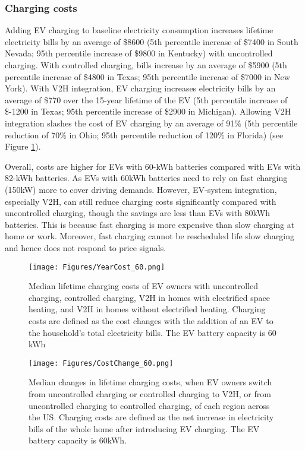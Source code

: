 \documentclass[11pt,preprint]{elsarticle}
\begin{document}
\subsubsection{Charging costs}

Adding EV charging to baseline electricity consumption increases lifetime electricity bills by an average of \$8600 (5th percentile increase of \$7400 in South Nevada; 95th percentile increase of \$9800 in Kentucky) with uncontrolled charging. With controlled charging, bills increase by an average of \$5900 (5th percentile increase of \$4800 in Texas; 95th percentile increase of \$7000 in New York). With V2H integration, EV charging increases electricity bills by an average of \$770 over the 15-year lifetime of the EV (5th percentile increase of \$-1200 in Texas; 95th percentile increase of \$2900 in Michigan). Allowing V2H integration slashes the cost of EV charging by an average of 91\% (5th percentile reduction of 70\% in Ohio; 95th percentile reduction of 120\% in Florida) (see Figure \ref{fig:lifetimecosts60}). 

Overall, costs are higher for EVs with 60-kWh batteries compared with EVs with 82-kWh batteries. As EVs with 60kWh batteries need to rely on fast charging (150kW) more to cover driving demands. However, EV-system integration, especially V2H, can still reduce charging costs significantly compared with uncontrolled charging, though the savings are less than EVs with 80kWh batteries. This is because fast charging is more expensive than slow charging at home or work. Moreover, fast charging cannot be rescheduled life slow charging and hence does not respond to price signals.

\begin{figure}[H]
    \centering
    \texttt{[image: Figures/YearCost\_60.png]}
    \caption{Median lifetime charging costs of EV owners with uncontrolled charging, controlled charging, V2H in homes with electrified space heating, and V2H in homes without electrified heating. Charging costs are defined as the cost changes with the addition of an EV to the household's total electricity bills. The EV battery capacity is 60 kWh}
    \label{fig:lifetimecosts60}
\end{figure}

\begin{figure}[H]
    \centering
    \texttt{[image: Figures/CostChange\_60.png]}
    \caption{Median changes in lifetime charging costs, when EV owners switch from uncontrolled charging or controlled charging to V2H, or from uncontrolled charging to controlled charging, of each region across the US. Charging costs are defined as the net increase in electricity bills of the whole home after introducing EV charging. The EV battery capacity is 60kWh.}
    \label{fig:costchange60}
\end{figure}
\end{document}
